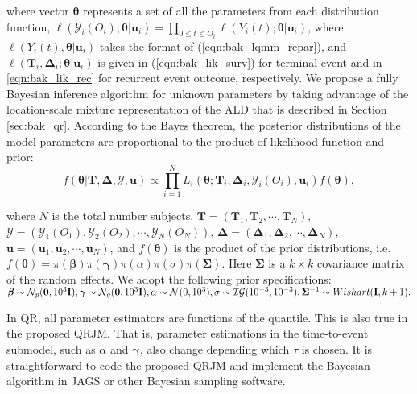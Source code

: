 \noindent where vector $\boldsymbol{\theta}$ represents a set of all the parameters from each distribution function,  $\ell(\mathcal{Y}_{i}(O_i); \boldsymbol{\theta}|\boldsymbol{u}_i)=\prod_{0\le t\le O_i}\ell(Y_{i}(t); \boldsymbol{\theta}|\boldsymbol{u}_i)$, where $\ell(Y_{i}(t), \boldsymbol{\theta}|\boldsymbol{u}_i)$ takes the format of (\ref{eqn:bak_lqmm_repar}), and $\ell(\boldsymbol{T}_i, \boldsymbol{\Delta}_i; \boldsymbol{\theta}|\boldsymbol{u}_i)$ is given in (\ref{eqn:bak_lik_surv}) for terminal event and in \eqref{eqn:bak_lik_rec} for recurrent event outcome, respectively. We propose a fully Bayesian inference algorithm for unknown parameters by taking advantage of the location-scale mixture representation of the ALD that is described in Section \ref{sec:bak_qr}. According to the Bayes theorem, the posterior distributions of the model parameters are proportional to the product of likelihood function and prior:
\begin{equation}\label{eqn:bak_posterior}
f(\boldsymbol{\theta}|\boldsymbol{T}, \boldsymbol{\Delta}, \bm{\mathcal{Y}}, \boldsymbol{u})\propto \prod_{i=1}^N L_i(\boldsymbol{\theta};{\boldsymbol T}_i, \boldsymbol{\Delta}_i, \mathcal{Y}_{i}(O_i), \boldsymbol{u}_i) f(\boldsymbol{\theta}),
\end{equation}

\noindent where $N$ is the total number subjects, $\boldsymbol{T}=(\boldsymbol{T}_1, \boldsymbol{T}_2, \cdots, \boldsymbol{T}_N)$, $\bm{\mathcal{Y}}=(\mathcal{Y}_{1}(O_1), \mathcal{Y}_{2}(O_2), \cdots, \mathcal{Y}_{N}(O_N))$, $\boldsymbol{\Delta} =(\boldsymbol{\Delta}_1, \boldsymbol{\Delta}_2, \cdots, \boldsymbol{\Delta}_N)$, $\boldsymbol{u}=(\boldsymbol{u}_1, \boldsymbol{u}_2, \cdots, \boldsymbol{u}_N)$, and $f(\boldsymbol{\theta})$ is the product of the prior distributions, i.e. $f(\boldsymbol{\theta})=\pi(\boldsymbol{\beta})\pi(\boldsymbol{\gamma})\pi(\alpha)\pi(\sigma)\pi(\boldsymbol{\Sigma})$. Here $\boldsymbol{\Sigma}$ is a $k\times k$ covariance matrix of the random effects. We adopt the following prior specifications:
$\boldsymbol{\beta} \sim \mathcal{N}_p({\boldsymbol 0}, 10^3{\bf I}), \boldsymbol{\gamma} \sim \mathcal{N}_q({\boldsymbol 0}, 10^3{\bf I}), \alpha\sim \mathcal{N}(0, 10^3), \sigma\sim \mathcal{IG}(10^{-3}, 10^{-3}), \boldsymbol{\Sigma}^{-1}\sim Wishart({\bf I}, k+1).$

In QR, all parameter estimators are functions of the quantile. This is also true in the proposed QRJM. That is, parameter estimations in the time-to-event submodel, such as $\alpha$ and $\boldsymbol{\gamma}$, also change depending which $\tau$ is chosen. It is straightforward to code the proposed QRJM and implement the Bayesian algorithm in \textsf{JAGS} \citep{plummer2003jags} or other Bayesian sampling software.


